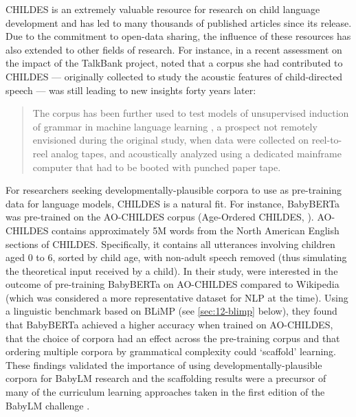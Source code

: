 CHILDES is an extremely valuable resource for research on child language development and has led to many thousands of published articles since its release. Due to the commitment to open-data sharing, the influence of these resources has also extended to other fields of research. For instance, in a recent assessment on the impact of the TalkBank project, \citet{bernstein_ratner_augmenting_2024} noted that a corpus she had contributed to CHILDES --- originally collected to study the acoustic features of child-directed speech \citep{Ratner_1984} --- was still leading to new insights forty years later:
\begin{quote}
The corpus has been further used to test models of unsupervised induction of grammar in machine language learning \citep{glushchenko_programmatic_2019}, a prospect not remotely envisioned during the original study, when data were collected on reel-to-reel analog tapes, and acoustically analyzed using a dedicated mainframe computer that had to be booted with punched paper tape.
\end{quote}

For researchers seeking developmentally-plausible corpora to use as pre-training data for language models, CHILDES is a natural fit. For instance, BabyBERTa was pre-trained on the AO-CHILDES corpus (Age-Ordered CHILDES, \citep{huebner2021using}). AO-CHILDES contains approximately 5M words from the North American English sections of CHILDES. Specifically, it contains all utterances involving children aged 0 to 6, sorted by child age, with non-adult speech removed (thus simulating the theoretical input received by a child). In their study, \citet{huebner-etal-2021-babyberta} were interested in the outcome of pre-training BabyBERTa on AO-CHILDES compared to Wikipedia (which was considered a more representative dataset for NLP at the time). Using a linguistic benchmark based on BLiMP (see \cref{sec:12-blimp} below), they found that BabyBERTa achieved a higher accuracy when trained on AO-CHILDES, that the choice of corpora had an effect across the pre-training corpus and that ordering multiple corpora by grammatical complexity could `scaffold' learning. These findings validated the importance of using developmentally-plausible corpora for BabyLM research and the scaffolding results were a precursor of many of the curriculum learning approaches taken in the first edition of the BabyLM challenge \addcites.


